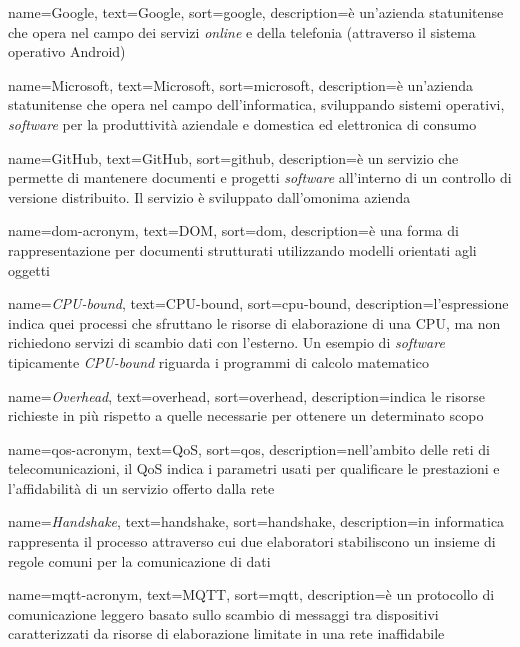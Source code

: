 {
  name=Google,
  text=Google,
  sort=google,
  description={è un'azienda statunitense che opera nel campo dei servizi \emph{online} e della telefonia (attraverso il sistema operativo Android)}
}

{
  name=Microsoft,
  text=Microsoft,
  sort=microsoft,
  description={è un'azienda statunitense che opera nel campo dell'informatica, sviluppando sistemi operativi, \emph{software} per la produttività aziendale e domestica ed elettronica di consumo}
}

{
  name=GitHub,
  text=GitHub,
  sort=github,
  description={è un servizio che permette di mantenere documenti e progetti \emph{software} all'interno di un controllo di versione distribuito. Il servizio è sviluppato dall'omonima azienda}
}

{
  name=\gls{dom-acronym},
  text=DOM,
  sort=dom,
  description={è una forma di rappresentazione per documenti strutturati utilizzando modelli orientati agli oggetti}
}

{
  name=\emph{CPU-bound},
  text=CPU-bound,
  sort=cpu-bound,
  description={l'espressione indica quei processi che sfruttano le risorse di elaborazione di una CPU, ma non richiedono servizi di scambio dati con l'esterno. Un esempio di \emph{software} tipicamente \emph{CPU-bound} riguarda i programmi di calcolo matematico}
}

{
  name=\emph{Overhead},
  text=overhead,
  sort=overhead,
  description={indica le risorse richieste in più rispetto a quelle necessarie per ottenere un determinato scopo}
}

{
  name=\gls{qos-acronym},
  text=QoS,
  sort=qos,
  description={nell'ambito delle reti di telecomunicazioni, il QoS indica i parametri usati per qualificare le prestazioni e l'affidabilità di un servizio offerto dalla rete}
}

{
  name=\emph{Handshake},
  text=handshake,
  sort=handshake,
  description={in informatica rappresenta il processo attraverso cui due elaboratori stabiliscono un insieme di regole comuni per la comunicazione di dati}
}

{
  name=\gls{mqtt-acronym},
  text=MQTT,
  sort=mqtt,
  description={è un protocollo di comunicazione leggero basato sullo scambio di messaggi tra dispositivi caratterizzati da risorse di elaborazione limitate in una rete inaffidabile}
}

